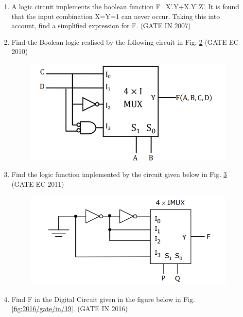 \begin{enumerate}
\begin{figure}[H]
	\caption{}
	\label{fig:2007-gate-ec-43}
\end{figure}
\item
\label{prob:2007-gate-in-10}
A logic circuit implements the boolean function F=X'.Y+X.Y'.Z'. It is found that the input combination X=Y=1 can never occur. Taking this into account, find a simplified expression for F.
\hfill (GATE IN 2007)
\item
\label{prob:2010-gate-ec-39}
Find the Boolean logic realised by the following circuit in Fig.
\ref{fig:2010-gate-ec-39}
\hfill (GATE EC 2010)
\begin{figure}[H]
	\centering
	\includegraphics[width=1\columnwidth]{figs/2010-gate-ec-39.png}
	\caption{}
	\label{fig:2010-gate-ec-39}
\end{figure}
\item
\label{prob:2011-gate-ec-20}
Find the logic function implemented by the circuit given below
in Fig.
\ref{fig:2011-gate-ec-20}
\hfill (GATE EC 2011)
\begin{figure}[H]
	\centering
	\includegraphics[width=\columnwidth]{figs/2011-gate-ec-20.png}
	\caption{}
	\label{fig:2011-gate-ec-20}
\end{figure}
\item
\label{prob:2016/gate/in/19}
Find F in the Digital Circuit given in the figure below
in Fig. \ref{fig:2016/gate/in/19}.
\hfill (GATE IN 2016)
\begin{figure}[H]
	\centering
	\begin{tikzpicture}




\end{tikzpicture}
\end{figure}
\end{enumerate}
